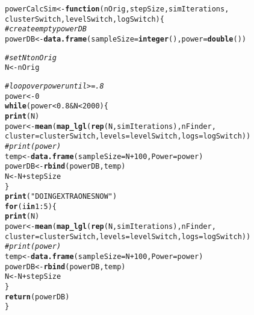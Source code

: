 \documentclass[10pt]{article}\usepackage[]{graphicx}\usepackage[]{color}
\makeatletter
\newcommand{\hlnum}[1]{\textcolor[rgb]{0.686,0.059,0.569}{#1}}%
\newcommand{\hlstr}[1]{\textcolor[rgb]{0.192,0.494,0.8}{#1}}%
\newcommand{\hlcom}[1]{\textcolor[rgb]{0.678,0.584,0.686}{\textit{#1}}}%
\newcommand{\hlopt}[1]{\textcolor[rgb]{0,0,0}{#1}}%
\newcommand{\hlstd}[1]{\textcolor[rgb]{0.345,0.345,0.345}{#1}}%
\newcommand{\hlkwa}[1]{\textcolor[rgb]{0.161,0.373,0.58}{\textbf{#1}}}%
\newcommand{\hlkwb}[1]{\textcolor[rgb]{0.69,0.353,0.396}{#1}}%
\newcommand{\hlkwc}[1]{\textcolor[rgb]{0.333,0.667,0.333}{#1}}%
\newcommand{\hlkwd}[1]{\textcolor[rgb]{0.737,0.353,0.396}{\textbf{#1}}}%
\newenvironment{kframe}{%
 \def\at@end@of@kframe{}%
 \ifinner\ifhmode%
  \def\at@end@of@kframe{\end{minipage}}%
  \begin{minipage}{\columnwidth}%
 \fi\fi%
 \def\FrameCommand##1{\hskip\@totalleftmargin \hskip-\fboxsep
 \colorbox{shadecolor}{##1}\hskip-\fboxsep
     \hskip-\linewidth \hskip-\@totalleftmargin \hskip\columnwidth}%
 \MakeFramed {\advance\hsize-\width
   \@totalleftmargin\z@ \linewidth\hsize
   \@setminipage}}%
 {\par\unskip\endMakeFramed%
 \at@end@of@kframe}
\newenvironment{knitrout}{}{} %
\makeatother
\begin{document}
\begin{knitrout}
\color{fgcolor}\begin{kframe}
\begin{alltt}
\hlstd{powerCalcSim} \hlkwb{<-} \hlkwa{function}\hlstd{(}\hlkwc{nOrig}\hlstd{,} \hlkwc{stepSize}\hlstd{,} \hlkwc{simIterations}\hlstd{,}
                         \hlkwc{clusterSwitch}\hlstd{,} \hlkwc{levelSwitch}\hlstd{,} \hlkwc{logSwitch}\hlstd{)\{}
  \hlcom{# create empty powerDB}
  \hlstd{powerDB} \hlkwb{<-} \hlkwd{data.frame}\hlstd{(}\hlkwc{sampleSize} \hlstd{=} \hlkwd{integer}\hlstd{(),} \hlkwc{power} \hlstd{=} \hlkwd{double}\hlstd{())}

  \hlcom{# set N to nOrig }
  \hlstd{N} \hlkwb{<-} \hlstd{nOrig}

  \hlcom{# loop over power until >=.8}
  \hlstd{power} \hlkwb{<-} \hlnum{0}
  \hlkwa{while}\hlstd{(power} \hlopt{<} \hlnum{0.8} \hlopt{&} \hlstd{N} \hlopt{<} \hlnum{2000}\hlstd{)\{}
  \hlkwd{print}\hlstd{(N)}
  \hlstd{power} \hlkwb{<-} \hlkwd{mean}\hlstd{(}\hlkwd{map_lgl}\hlstd{(}\hlkwd{rep}\hlstd{(N,simIterations),nFinder,}
                        \hlkwc{cluster} \hlstd{= clusterSwitch,} \hlkwc{levels} \hlstd{= levelSwitch,} \hlkwc{logs} \hlstd{= logSwitch))}
  \hlcom{#print(power)}
  \hlstd{temp} \hlkwb{<-} \hlkwd{data.frame}\hlstd{(}\hlkwc{sampleSize} \hlstd{= N} \hlopt{+} \hlnum{100}\hlstd{,} \hlkwc{Power} \hlstd{= power)}
  \hlstd{powerDB} \hlkwb{<-} \hlkwd{rbind}\hlstd{(powerDB, temp)}
  \hlstd{N} \hlkwb{<-} \hlstd{N} \hlopt{+} \hlstd{stepSize}
  \hlstd{\}}
  \hlkwd{print}\hlstd{(}\hlstr{"DOING EXTRA ONES NOW"}\hlstd{)}
  \hlkwa{for}\hlstd{(i} \hlkwa{in} \hlnum{1}\hlopt{:}\hlnum{5}\hlstd{)\{}
  \hlkwd{print}\hlstd{(N)}
  \hlstd{power} \hlkwb{<-} \hlkwd{mean}\hlstd{(}\hlkwd{map_lgl}\hlstd{(}\hlkwd{rep}\hlstd{(N,simIterations),nFinder,}
                        \hlkwc{cluster} \hlstd{= clusterSwitch,} \hlkwc{levels} \hlstd{= levelSwitch,} \hlkwc{logs} \hlstd{= logSwitch))}
  \hlcom{#print(power)}
  \hlstd{temp} \hlkwb{<-} \hlkwd{data.frame}\hlstd{(}\hlkwc{sampleSize} \hlstd{= N}\hlopt{+}\hlnum{100}\hlstd{,} \hlkwc{Power} \hlstd{= power)}
  \hlstd{powerDB} \hlkwb{<-} \hlkwd{rbind}\hlstd{(powerDB, temp)}
  \hlstd{N} \hlkwb{<-} \hlstd{N} \hlopt{+} \hlstd{stepSize}
  \hlstd{\}}
  \hlkwd{return}\hlstd{(powerDB)}
\hlstd{\}}
\end{alltt}
\end{kframe}
\end{knitrout}
\end{document}
